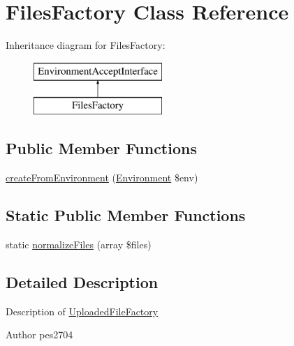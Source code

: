 \hypertarget{class_pes_1_1_http_1_1_factory_1_1_files_factory}{}\section{Files\+Factory Class Reference}
\label{class_pes_1_1_http_1_1_factory_1_1_files_factory}
Inheritance diagram for Files\+Factory\+:\begin{figure}[H]
\begin{center}
\leavevmode
\includegraphics[height=2.000000cm]{class_pes_1_1_http_1_1_factory_1_1_files_factory}
\end{center}
\end{figure}
\subsection*{Public Member Functions}
\begin{DoxyCompactItemize}
\item 
\mbox{\hyperlink{class_pes_1_1_http_1_1_factory_1_1_files_factory_af8ddc9154d8a4b8724714c21efcfa47d}{create\+From\+Environment}} (\mbox{\hyperlink{class_pes_1_1_http_1_1_environment}{Environment}} \$env)
\end{DoxyCompactItemize}
\subsection*{Static Public Member Functions}
\begin{DoxyCompactItemize}
\item 
static \mbox{\hyperlink{class_pes_1_1_http_1_1_factory_1_1_files_factory_a381f2024f052049eb0b77ee47199861b}{normalize\+Files}} (array \$files)
\end{DoxyCompactItemize}


\subsection{Detailed Description}
Description of \mbox{\hyperlink{class_pes_1_1_http_1_1_factory_1_1_uploaded_file_factory}{Uploaded\+File\+Factory}}

\begin{DoxyAuthor}{Author}
pes2704 
\end{DoxyAuthor}


